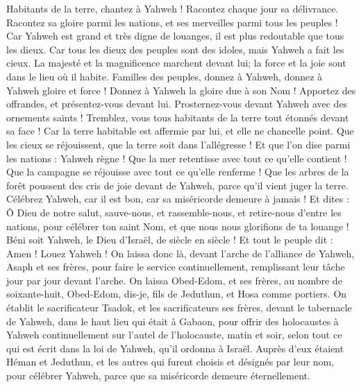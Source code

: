 \begin{multicols}{2}
Habitants de la terre, chantez à Yahweh ! Racontez chaque jour sa délivrance.
Racontez sa gloire parmi les nations, et ses merveilles parmi tous les peuples !
Car Yahweh est grand et très digne de louanges, il est plus redoutable que tous les dieux.
Car tous les dieux des peuples sont des idoles, mais Yahweh a fait les cieux.
La majesté et la magnificence marchent devant lui; la force et la joie sont dans le lieu où il habite.
Familles des peuples, donnez à Yahweh, donnez à Yahweh gloire et force !
Donnez à Yahweh la gloire due à son Nom ! Apportez des offrandes, et présentez-vous devant lui. Prosternez-vous devant Yahweh avec des ornements saints !
Tremblez, vous tous habitants de la terre tout étonnés devant sa face ! Car la terre habitable est affermie par lui, et elle ne chancelle point.
Que les cieux se réjouissent, que la terre soit dans l’allégresse ! Et que l’on dise parmi les nations : Yahweh règne !
Que la mer retentisse avec tout ce qu'elle contient ! Que la campagne se réjouisse avec tout ce qu’elle renferme !
Que les arbres de la forêt poussent des cris de joie devant de Yahweh, parce qu'il vient juger la terre.
Célébrez Yahweh, car il est bon, car sa miséricorde demeure à jamais !
Et dites : Ô Dieu de notre salut, sauve-nous, et rassemble-nous, et retire-nous d'entre les nations, pour célébrer ton saint Nom, et que nous nous glorifions de ta louange !
Béni soit Yahweh, le Dieu d'Israël, de siècle en siècle ! Et tout le peuple dit : Amen ! Louez Yahweh !
On laissa donc là, devant l’arche de l'alliance de Yahweh, Asaph et ses frères, pour faire le service continuellement, remplissant leur tâche jour par jour devant l’arche.
On laissa Obed-Edom, et ses frères, au nombre de soixante-huit, Obed-Edom, dis-je, fils de Jeduthun, et Hosa comme portiers.
On établit le sacrificateur Tsadok, et les sacrificateurs ses frères, devant le tabernacle de Yahweh, dans le haut lieu qui était à Gabaon,
pour offrir des holocaustes à Yahweh continuellement sur l'autel de l'holocauste, matin et soir, selon tout ce qui est écrit dans la loi de Yahweh, qu’il ordonna à Israël.
Auprès d’eux étaient Héman et Jeduthun, et les autres qui furent choisis et désignés par leur nom, pour célébrer Yahweh, parce que sa miséricorde demeure éternellement.

\end{multicols}
